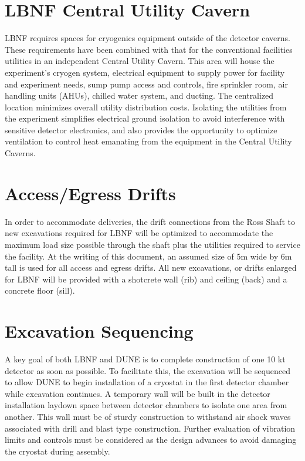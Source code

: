 \section{LBNF Central Utility Cavern}
\label{sec:fscf-excav-util-cav}

LBNF requires spaces for cryogenics equipment outside of the detector caverns. These requirements have been combined with that for the conventional facilities utilities in an independent Central Utility Cavern. This area will house the experiment's cryogen system, electrical equipment to supply power for facility and experiment needs, sump pump access and controls, fire sprinkler room, air handling units (AHUs), chilled water system, and ducting. The centralized location minimizes overall utility distribution costs. Isolating the utilities from the experiment simplifies electrical ground isolation to avoid interference with sensitive detector electronics, and also provides the opportunity to optimize ventilation to control heat emanating from the equipment in the Central Utility Caverns.

\section{Access/Egress Drifts}
\label{sec:fscf-excav-access-drifts}

In order to accommodate deliveries, the drift connections from the Ross Shaft to new excavations required for LBNF will be optimized to accommodate the maximum load size possible through the shaft plus the utilities required to service the facility. At the writing of this document, an assumed size of 5m wide by 6m tall is used for all access and egress drifts. All new excavations, or drifts enlarged for LBNF will be provided with a shotcrete wall (rib) and ceiling (back) and a concrete floor (sill).

\section{Excavation Sequencing}
\label{sec:fscf-excav-exc-seq}

A key goal of both LBNF and DUNE is to complete construction of one 10 kt detector as soon as possible. To facilitate this, the excavation will be sequenced to allow DUNE to begin installation of a cryostat in the first detector chamber while excavation continues. A temporary wall will be built in the detector installation laydown space between detector chambers to isolate one area from another. This wall must be of sturdy construction to withstand air shock waves associated with drill and blast type construction. Further evaluation of vibration limits and controls must be considered as the design advances to avoid damaging the cryostat during assembly.

